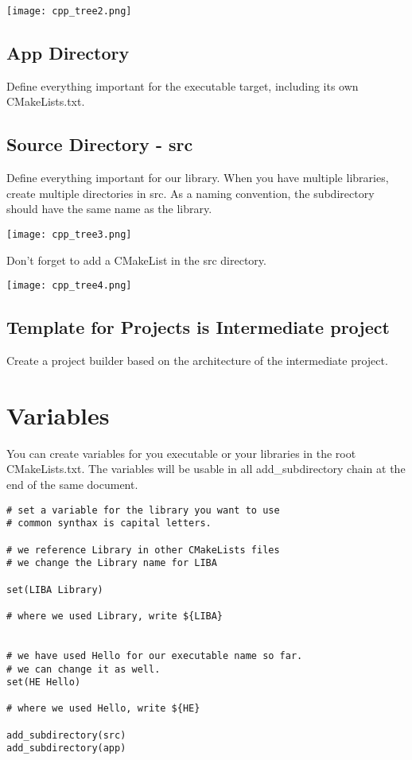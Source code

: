 \documentclass[openany]{report}
\begin{document}
\begin{center}
    \texttt{[image: cpp\_tree2.png]}
\end{center}

\subsection{App Directory}

Define everything important for the executable target, including its own CMakeLists.txt.

\subsection{Source Directory - src}

Define everything important for our library. When you have multiple libraries, create multiple directories in
src. As a naming convention, the subdirectory should have the same name as the library.

\begin{center}
    \texttt{[image: cpp\_tree3.png]}
\end{center}

Don't forget to add a CMakeList in the src directory.


\begin{center}
    \texttt{[image: cpp\_tree4.png]}
\end{center}


\subsection{Template for Projects is Intermediate project}

Create a project builder based on the architecture of the intermediate project.


\section{Variables}

You can create variables for you executable or your libraries in the root CMakeLists.txt. The variables
will be usable in all add\_subdirectory chain at the end of the same document.

\begin{verbatim}
# set a variable for the library you want to use
# common synthax is capital letters.

# we reference Library in other CMakeLists files
# we change the Library name for LIBA

set(LIBA Library)

# where we used Library, write ${LIBA}


# we have used Hello for our executable name so far.
# we can change it as well.
set(HE Hello)

# where we used Hello, write ${HE}

add_subdirectory(src)
add_subdirectory(app)
\end{verbatim}
\end{document}
